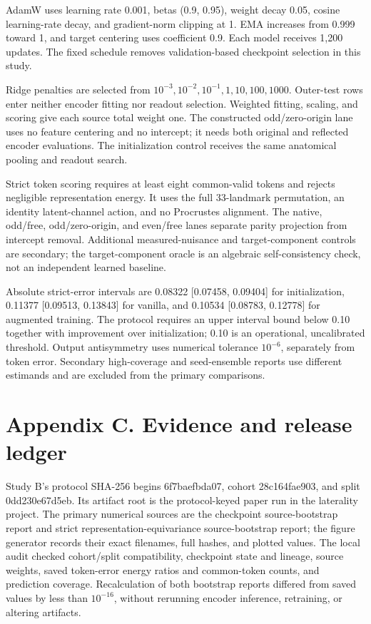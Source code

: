\documentclass{article}
\begin{document}
AdamW uses learning rate 0.001, betas (0.9, 0.95), weight decay 0.05,
cosine learning-rate decay, and gradient-norm clipping at 1. EMA
increases from 0.999 toward 1, and target centering uses coefficient
0.9. Each model receives 1,200 updates. The fixed schedule removes
validation-based checkpoint selection in this study.

Ridge penalties are selected from
\(10^{-3},10^{-2},10^{-1},1,10,100,1000\). Outer-test rows enter neither
encoder fitting nor readout selection. Weighted fitting, scaling, and
scoring give each source total weight one. The constructed
odd/zero-origin lane uses no feature centering and no intercept; it
needs both original and reflected encoder evaluations. The
initialization control receives the same anatomical pooling and readout
search.

Strict token scoring requires at least eight common-valid tokens and
rejects negligible representation energy. It uses the full 33-landmark
permutation, an identity latent-channel action, and no Procrustes
alignment. The native, odd/free, odd/zero-origin, and even/free lanes
separate parity projection from intercept removal. Additional
measured-nuisance and target-component controls are secondary; the
target-component oracle is an algebraic self-consistency check, not an
independent learned baseline.

Absolute strict-error intervals are 0.08322 {[}0.07458, 0.09404{]} for
initialization, 0.11377 {[}0.09513, 0.13843{]} for vanilla, and 0.10534
{[}0.08783, 0.12778{]} for augmented training. The protocol requires an
upper interval bound below 0.10 together with improvement over
initialization; 0.10 is an operational, uncalibrated threshold. Output
antisymmetry uses numerical tolerance \(10^{-6}\), separately from token
error. Secondary high-coverage and seed-ensemble reports use different
estimands and are excluded from the primary comparisons.

\section{Appendix C. Evidence and release
ledger}\label{appendix-c.-evidence-and-release-ledger}

Study B's protocol SHA-256 begins 6f7baefbda07, cohort 28c164fae903, and
split 0dd230e67d5eb. Its artifact root is the protocol-keyed paper run
in the laterality project. The primary numerical sources are the
checkpoint source-bootstrap report and strict
representation-equivariance source-bootstrap report; the figure
generator records their exact filenames, full hashes, and plotted
values. The local audit checked cohort/split compatibility, checkpoint
state and lineage, source weights, saved token-error energy ratios and
common-token counts, and prediction coverage. Recalculation of both
bootstrap reports differed from saved values by less than \(10^{-16}\),
without rerunning encoder inference, retraining, or altering artifacts.
\end{document}
